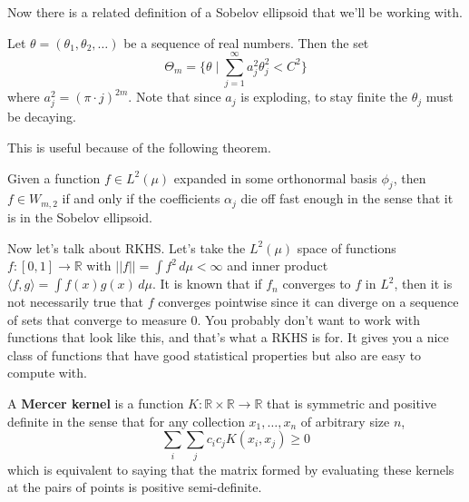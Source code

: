   Now there is a related definition of a Sobelov ellipsoid that we'll be working with. 

  \begin{definition}
    Let $\theta = (\theta_1, \theta_2, \ldots)$ be a sequence of real numbers. Then the set 
    \begin{equation}
      \Theta_m = \bigg\{ \theta \mid \sum_{j=1}^\infty a_j^2 \theta_j^2 < C^2 \bigg\}
    \end{equation}
    where $a_j^2 = (\pi \cdot j)^{2m}$. Note that since $a_j$ is exploding, to stay finite the $\theta_j$ must be decaying.
  \end{definition}

  This is useful because of the following theorem. 
  
  \begin{theorem}
    Given a function $f \in L^2(\mu)$ expanded in some orthonormal basis $\phi_j$, then $f \in W_{m, 2}$ if and only if the coefficients $\alpha_j$ die off fast enough in the sense that it is in the Sobelov ellipsoid. 
  \end{theorem}

  Now let's talk about RKHS. Let's take the $L^2(\mu)$ space of functions $f: [0, 1] \rightarrow \mathbb{R}$ with $||f|| = \int f^2 \,d\mu < \infty$ and inner product $\langle f, g \rangle = \int f(x) g(x) \,d\mu$. It is known that if $f_n$ converges to $f$ in $L^2$, then it is not necessarily true that $f$ converges pointwise since it can diverge on a sequence of sets that converge to measure $0$. You probably don't want to work with functions that look like this, and that's what a RKHS is for. It gives you a nice class of functions that have good statistical properties but also are easy to compute with.  

  \begin{definition}
    A \textbf{Mercer kernel} is a function $K: \mathbb{R} \times \mathbb{R} \rightarrow \mathbb{R}$ that is symmetric and positive definite in the sense that for any collection $x_1, \ldots, x_n$ of arbitrary size $n$, 
    \begin{equation}
      \sum_i \sum_j c_i c_j K(x_i, x_j) \geq 0 
    \end{equation}
    which is equivalent to saying that the matrix formed by evaluating these kernels at the pairs of points is positive semi-definite. 
  \end{definition}

